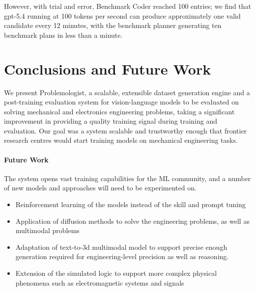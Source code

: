 \documentclass[conference]{IEEEtran}
\begin{document}
However, with trial and error, Benchmark Coder reached 100 entries; we find that gpt-5.4 running at 100 tokens per second can produce approximately one valid candidate every 12 minutes, with the benchmark planner generating ten benchmark plans in less than a minute.

\section{Conclusions and Future Work}
We present Problemologist, a scalable, extensible dataset generation engine and a post-training evaluation system for vision-language models to be evaluated on solving mechanical and electronics engineering problems, taking a significant improvement in providing a quality training signal during training and evaluation. Our goal was a system scalable and trustworthy enough that frontier research centres would start training models on mechanical engineering tasks.



\paragraph{Future Work}
The system opens vast training capabilities for the ML community, and a number of new models and approaches will need to be experimented on.
\begin{itemize}
    \item Reinforcement learning of the models instead of the skill and prompt tuning
    \item Application of diffusion methods to solve the engineering problems, as well as multimodal problems
    \item Adaptation of text-to-3d multimodal model to support precise enough generation required for engineering-level precision as well as reasoning.
    \item Extension of the simulated logic to support more complex physical phenomena such as electromagnetic systems and signals
\end{itemize}
\end{document}
